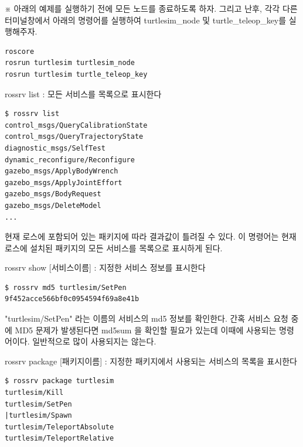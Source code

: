\vspace{\baselineskip}
\noindent
※ 아래의 예제를 실행하기 전에 모든 노드를 종료하도록 하자. 그리고 난후, 각각 다른 터미널창에서 아래의 명령어를 실행하여 turtlesim\_node 및 turtle\_teleop\_key를 실행해주자.

\begin{lstlisting}[language=ROS]
roscore
rosrun turtlesim turtlesim_node 
rosrun turtlesim turtle_teleop_key
\end{lstlisting}

\setcounter{num}{0}

\vspace{\baselineskip}
\noindent
{}\circled{\thenum} rossrv list : 모든 서비스를 목록으로 표시한다

\begin{lstlisting}[language=ROS]
$ rossrv list
control_msgs/QueryCalibrationState
control_msgs/QueryTrajectoryState
diagnostic_msgs/SelfTest
dynamic_reconfigure/Reconfigure
gazebo_msgs/ApplyBodyWrench
gazebo_msgs/ApplyJointEffort
gazebo_msgs/BodyRequest
gazebo_msgs/DeleteModel
...
\end{lstlisting}

\noindent
현재 로스에 포함되어 있는 패키지에 따라 결과값이 틀려질 수 있다. 이 명령어는 현재 로스에 설치된 패키지의 모든 서비스를 목록으로 표시하게 된다.

\vspace{\baselineskip}
\noindent
{}\circled{\thenum} rossrv show [서비스이름] : 지정한 서비스 정보를 표시한다

\begin{lstlisting}[language=ROS]
$ rossrv md5 turtlesim/SetPen 
9f452acce566bf0c0954594f69a8e41b
\end{lstlisting}

\noindent
"turtlesim/SetPen" 라는 이름의 서비스의 md5 정보를 확인한다. 간혹 서비스 요청 중에 MD5 문제가 발생된다면 md5sum 을 확인할 필요가 있는데 이때에 사용되는 명령어이다. 일반적으로 많이 사용되지는 않는다.

\vspace{\baselineskip}
\noindent
{}\circled{\thenum} rossrv package [패키지이름] : 지정한 패키지에서 사용되는 서비스의 목록을 표시한다

\begin{lstlisting}[language=ROS]
$ rossrv package turtlesim 
turtlesim/Kill
turtlesim/SetPen
|turtlesim/Spawn
turtlesim/TeleportAbsolute
turtlesim/TeleportRelative
\end{lstlisting}

